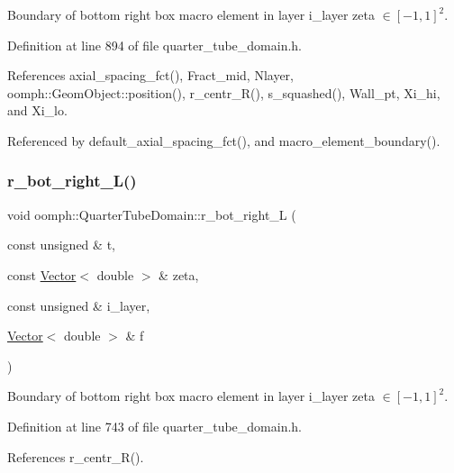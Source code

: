 Boundary of bottom right box macro element in layer i\+\_\+layer zeta $ \in [-1,1]^2 $. 



Definition at line 894 of file quarter\+\_\+tube\+\_\+domain.\+h.



References axial\+\_\+spacing\+\_\+fct(), Fract\+\_\+mid, Nlayer, oomph\+::\+Geom\+Object\+::position(), r\+\_\+centr\+\_\+\+R(), s\+\_\+squashed(), Wall\+\_\+pt, Xi\+\_\+hi, and Xi\+\_\+lo.



Referenced by default\+\_\+axial\+\_\+spacing\+\_\+fct(), and macro\+\_\+element\+\_\+boundary().

\mbox{\label{classoomph_1_1QuarterTubeDomain_a1c28597fc3361c177620ed914d1731ac}} 
\subsubsection{\texorpdfstring{r\+\_\+bot\+\_\+right\+\_\+\+L()}{r\_bot\_right\_L()}}
{\footnotesize\ttfamily void oomph\+::\+Quarter\+Tube\+Domain\+::r\+\_\+bot\+\_\+right\+\_\+L (\begin{DoxyParamCaption}\item[{const unsigned \&}]{t,  }\item[{const \hyperlink{classoomph_1_1Vector}{Vector}$<$ double $>$ \&}]{zeta,  }\item[{const unsigned \&}]{i\+\_\+layer,  }\item[{\hyperlink{classoomph_1_1Vector}{Vector}$<$ double $>$ \&}]{f }\end{DoxyParamCaption})\hspace{0.3cm}{\ttfamily [private]}}



Boundary of bottom right box macro element in layer i\+\_\+layer zeta $ \in [-1,1]^2 $. 



Definition at line 743 of file quarter\+\_\+tube\+\_\+domain.\+h.



References r\+\_\+centr\+\_\+\+R().



